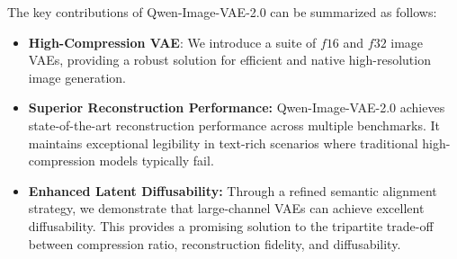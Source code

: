 The key contributions of Qwen-Image-VAE-2.0 can be summarized as follows:
\begin{itemize}
\item \textbf{High-Compression VAE}: We introduce a suite of $f16$ and $f32$ image VAEs, providing a robust solution for efficient and native high-resolution image generation.
\item \textbf{Superior Reconstruction Performance:} Qwen-Image-VAE-2.0 achieves state-of-the-art reconstruction performance across multiple benchmarks. It maintains exceptional legibility in text-rich scenarios where traditional high-compression models typically fail.
\item \textbf{Enhanced Latent Diffusability:} Through a refined semantic alignment strategy, we demonstrate that large-channel VAEs can achieve excellent diffusability. This provides a promising solution to the tripartite trade-off between compression ratio, reconstruction fidelity, and diffusability.
\end{itemize}
